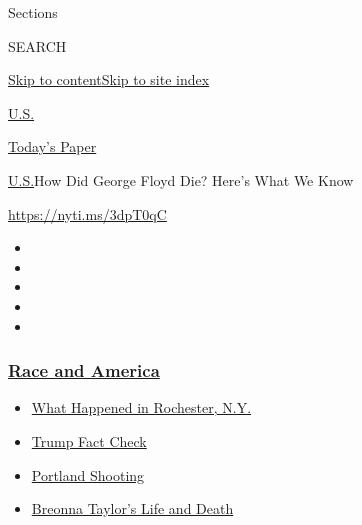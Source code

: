 Sections

SEARCH

\protect\hyperlink{site-content}{Skip to
content}\protect\hyperlink{site-index}{Skip to site index}

\href{https://www.nytimes3xbfgragh.onion/section/us}{U.S.}

\href{https://myaccount.nytimes3xbfgragh.onion/auth/login?response_type=cookie\&client_id=vi}{}

\href{https://www.nytimes3xbfgragh.onion/section/todayspaper}{Today's
Paper}

\href{/section/us}{U.S.}\textbar{}How Did George Floyd Die? Here's What
We Know

\url{https://nyti.ms/3dpT0qC}

\begin{itemize}
\item
\item
\item
\item
\item
\end{itemize}

\hypertarget{race-and-america}{%
\subsubsection{\texorpdfstring{\href{https://www.nytimes3xbfgragh.onion/news-event/george-floyd-protests-minneapolis-new-york-los-angeles?name=styln-george-floyd\&region=TOP_BANNER\&block=storyline_menu_recirc\&action=click\&pgtype=Article\&impression_id=5599a340-f2c6-11ea-be40-1d75ff99f920\&variant=undefined}{Race
and America}}{Race and America}}\label{race-and-america}}

\begin{itemize}
\tightlist
\item
  \href{https://www.nytimes3xbfgragh.onion/2020/09/04/nyregion/rochester-police-daniel-prude.html?name=styln-george-floyd\&region=TOP_BANNER\&block=storyline_menu_recirc\&action=click\&pgtype=Article\&impression_id=5599a341-f2c6-11ea-be40-1d75ff99f920\&variant=undefined}{What
  Happened in Rochester, N.Y.}
\item
  \href{https://www.nytimes3xbfgragh.onion/2020/09/01/us/politics/trump-fact-check-protests.html?name=styln-george-floyd\&region=TOP_BANNER\&block=storyline_menu_recirc\&action=click\&pgtype=Article\&impression_id=5599a342-f2c6-11ea-be40-1d75ff99f920\&variant=undefined}{Trump
  Fact Check}
\item
  \href{https://www.nytimes3xbfgragh.onion/2020/08/30/us/portland-shooting-explained.html?name=styln-george-floyd\&region=TOP_BANNER\&block=storyline_menu_recirc\&action=click\&pgtype=Article\&impression_id=5599ca50-f2c6-11ea-be40-1d75ff99f920\&variant=undefined}{Portland
  Shooting}
\item
  \href{https://www.nytimes3xbfgragh.onion/2020/08/30/us/breonna-taylor-police-killing.html?name=styln-george-floyd\&region=TOP_BANNER\&block=storyline_menu_recirc\&action=click\&pgtype=Article\&impression_id=5599ca51-f2c6-11ea-be40-1d75ff99f920\&variant=undefined}{Breonna
  Taylor's Life and Death}
\end{itemize}

